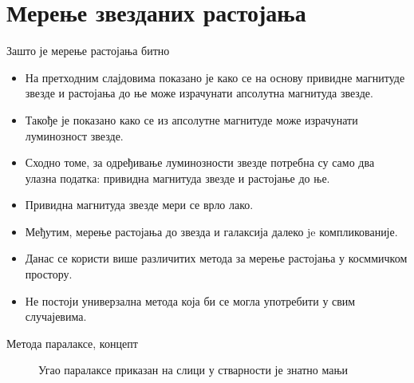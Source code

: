 \documentclass[aspectratio=169, xcolor=table, 10pt]{beamer}
\theoremstyle{definition}
\begin{document}
\section{Мерење звезданих растојања}

\begin{frame}{Зашто је мерење растојања битно}
  \begin{itemize}
    \item На претходним слајдовима показано је како се на основу привидне магнитуде звезде и растојања до ње може израчунати апсолутна магнитуда звезде.
    \item Такође је показано како се из апсолутне магнитуде може израчунати луминозност звезде.
    \item Сходно томе, за одређивање луминозности звезде потребна су само два улазна податка: привидна магнитуда звезде и растојање до ње.
    \item Привидна магнитуда звезде мери се врло лако.
    \item Међутим, мерење растојања до звезда и галаксија далеко je компликованије.
    \item Данас се користи више различитих метода за мерење растојања у косммичком простору.
    \item Не постоји универзална метода која би се могла употребити у свим случајевима.
  \end{itemize}
\end{frame}

\begin{frame}{Метода паралаксе, концепт}
  \begin{figure}
    \centering
    \captionsetup{width=\wd0}
    \caption{Угао паралаксе приказан на слици у стварности је знатно мањи}
  \end{figure}
\end{frame}
\end{document}

